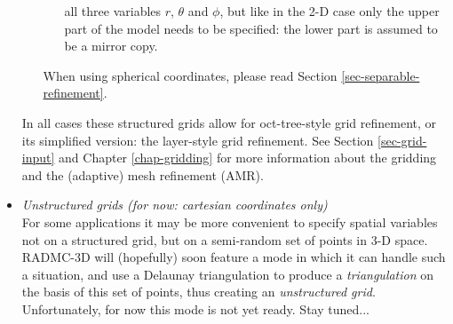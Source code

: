 \documentclass{report}
\begin{document}
\begin{itemize}
\begin{itemize}
\begin{itemize}
      all three variables $r$, $\theta$ and $\phi$, but like in the 2-D
      case only the upper part of the model needs to be specified: the 
      lower part is assumed to be a mirror copy.
    \end{itemize}
    When using spherical coordinates, please read Section
    \ref{sec-separable-refinement}.
  \end{itemize}
  In all cases these structured grids allow for oct-tree-style grid
  refinement, or its simplified version: the layer-style grid
  refinement. See Section \ref{sec-grid-input} and Chapter
  \ref{chap-gridding} for more information about the gridding and the
  (adaptive) mesh refinement (AMR).
\item {\em Unstructured grids (for now: cartesian coordinates only)}\\
  For some applications it may be more convenient to specify spatial
  variables not on a structured grid, but on a semi-random set of points in
  3-D space. RADMC-3D will (hopefully) soon feature a mode in which it can
  handle such a situation, and use a Delaunay triangulation to produce a
  {\em triangulation} on the basis of this set of points, thus creating an
  {\em unstructured grid}. Unfortunately, for now this mode is not yet
  ready. Stay tuned...
\end{itemize}
\end{document}
